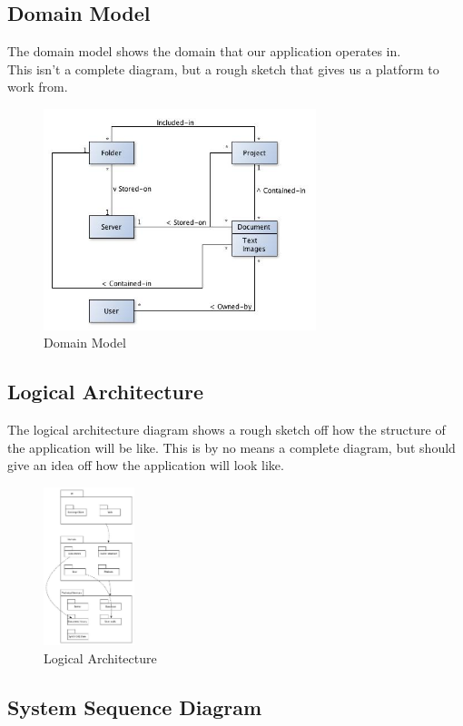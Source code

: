 \documentclass[11pt]{article}
\begin{document}
\subsection{Domain Model}
\label{sec-2-3}
The domain model shows the domain that our application operates in. \\
This isn't a complete diagram, but a rough sketch that gives us a platform to work from.
\begin{figure}[H]
  		\centering
    	\includegraphics[width=300px]{images/DomainModel.jpg}
    	\caption{Domain Model}
\end{figure}
\newpage
\subsection{Logical Architecture}
\label{sec-2-4}

   The logical architecture diagram shows a rough sketch off how the structure of the application
   will be like. This is by no means a complete diagram, but should give an idea off how
   the application will look like.
\begin{figure}[H]
  		\centering
    	\includegraphics[width=100px]{images/LogicalArchitecture.jpg}
    	\caption{Logical Architecture}
\end{figure}
\subsection{System Sequence Diagram}
\label{sec-2-5}
\end{document}
